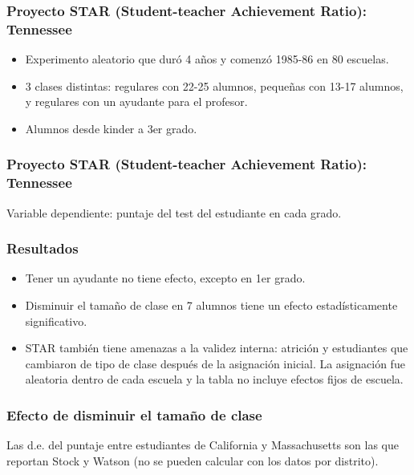 \documentclass[t, compress, spanish, aspectratio=169]{beamer}
\begin{document}
\begin{frame}
    \frametitle{Proyecto STAR (Student-teacher Achievement Ratio): Tennessee}
    \begin{itemize}
        \item Experimento aleatorio que dur\'o 4 a\~nos y comenz\'o 1985-86 en 80 escuelas.
        \item 3 clases distintas: regulares con 22-25 alumnos, peque\~nas con 13-17 alumnos, y regulares con un ayudante para el profesor.
        \item Alumnos desde kinder a 3er grado.
    \end{itemize}
\end{frame}
\begin{frame}
    \frametitle{Proyecto STAR (Student-teacher Achievement Ratio): Tennessee}
    \small
    Variable dependiente: puntaje del test del estudiante en cada grado.
    \begin{center}
    \scriptsize
    
    \end{center}
\end{frame}
\begin{frame}
    \frametitle{Resultados}
    \begin{itemize}
        \item Tener un ayudante no tiene efecto, excepto en 1er grado.
        \item Disminuir el tama\~no de clase en 7 alumnos tiene un efecto estad\'isticamente significativo.
        \item STAR tambi\'en tiene amenazas a la validez interna: atrici\'on y estudiantes que cambiaron de tipo de clase despu\'es de la asignaci\'on inicial. La asignaci\'on fue aleatoria dentro de cada escuela y la tabla no incluye efectos fijos de escuela.
    \end{itemize}
\end{frame}
\begin{frame}
    \frametitle{Efecto de disminuir el tama\~no de clase}
    \begin{center}
    \small
    
    \end{center}
    Las d.e. del puntaje entre estudiantes de California y Massachusetts son las que reportan Stock y Watson (no se pueden calcular con los datos por distrito).
\end{frame}
\end{document}
